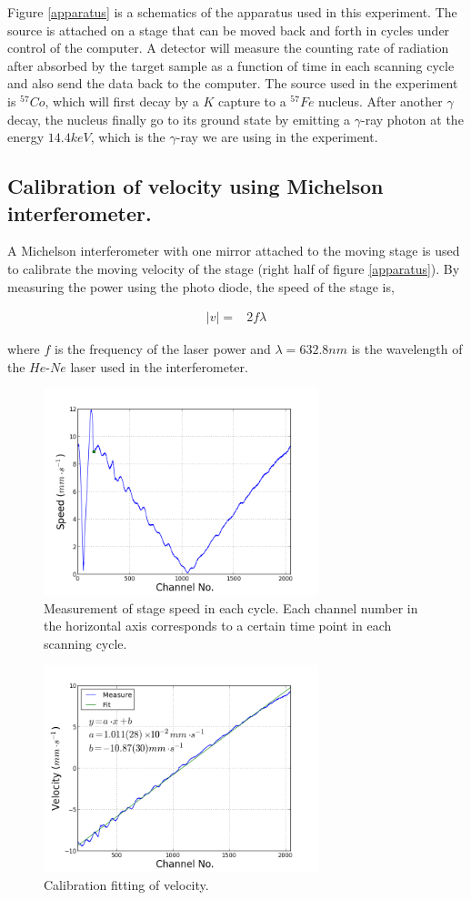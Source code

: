 \documentclass[aps,twocolumn,secnumarabic,balancelastpage,amsmath,amssymb,nofootinbib]{revtex4}
\newcommand{\eqar}[1]
{
  \begin{align*}
    #1
  \end{align*}
}
\newcommand{\abs}[1]{{\left|{#1}\right|}}
\begin{document}
Figure \ref{apparatus} is a schematics of the apparatus used in this experiment. The source is attached on a stage that can be moved back and forth in cycles under control of the computer. A detector will measure the counting rate of radiation after absorbed by the target sample as a function of time in each scanning cycle and also send the data back to the computer. The source used in the experiment is ${}^{57}Co$, which will first decay by a $K$ capture to a ${}^{57}Fe$ nucleus. After another $\gamma$ decay, the nucleus finally go to its ground state by emitting a $\gamma$-ray photon at the energy $14.4keV$, which is the $\gamma$-ray we are using in the experiment.

\subsection{Calibration of velocity using Michelson interferometer.}
A Michelson interferometer with one mirror attached to the moving stage is used to calibrate the moving velocity of the stage (right half of figure \ref{apparatus}). By measuring the power using the photo diode, the speed of the stage is,
\eqar{
  \abs{v}=&2f\lambda
}
where $f$ is the frequency of the laser power and $\lambda=632.8nm$ is the wavelength of the $He$-$Ne$ laser used in the interferometer.
\begin{figure}
  \includegraphics[width=8cm]{../pos_cal/res_v_raw.png}
  \caption{Measurement of stage speed in each cycle. Each channel number in the horizontal axis corresponds to a certain time point in each scanning cycle.}
  \label{v_raw}
\end{figure}
\begin{figure}
  \includegraphics[width=8cm]{../pos_cal/res_v_fit.png}
  \caption{Calibration fitting of velocity.}
  \label{v_fit}
\end{figure}
\end{document}

